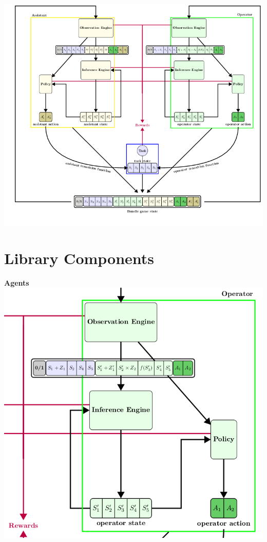 \documentclass[11pt, xcolor = {dvipsnames}]{beamer}
\begin{document}
\begin{frame}
\centering
\includegraphics[height=\textheight]{fig/bundle.png} 
\end{frame}



\section{Library Components}

\begin{frame}{\textbf{Agents}}
\centering
\includegraphics[height=.8\textheight]{fig/agents.png} 
\end{frame}
\end{document}
